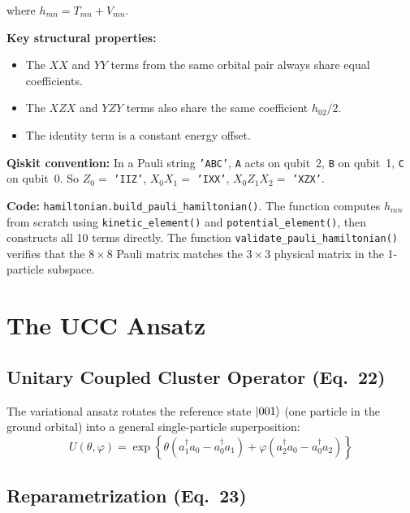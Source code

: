\documentclass[11pt,a4paper]{article}
\begin{document}
where $h_{mn} = T_{mn} + V_{mn}$.

\textbf{Key structural properties:}
\begin{itemize}[nosep]
  \item The $XX$ and $YY$ terms from the same orbital pair always share equal coefficients.
  \item The $XZX$ and $YZY$ terms also share the same coefficient $h_{02}/2$.
  \item The identity term is a constant energy offset.
\end{itemize}

\vspace{0.3em}
\noindent\textbf{Qiskit convention:} In a Pauli string \texttt{'ABC'}, \texttt{A} acts on qubit~2, \texttt{B} on qubit~1, \texttt{C} on qubit~0. So $Z_0 = $ \texttt{'IIZ'}, $X_0 X_1 = $ \texttt{'IXX'}, $X_0 Z_1 X_2 = $ \texttt{'XZX'}.

\vspace{0.3em}
\noindent\textbf{Code:} \texttt{hamiltonian.build\_pauli\_hamiltonian()}. The function computes $h_{mn}$ from scratch using \texttt{kinetic\_element()} and \texttt{potential\_element()}, then constructs all 10 terms directly. The function \texttt{validate\_pauli\_hamiltonian()} verifies that the $8\times 8$ Pauli matrix matches the $3\times 3$ physical matrix in the 1-particle subspace.


\section{The UCC Ansatz}

\subsection{Unitary Coupled Cluster Operator (Eq.~22)}

The variational ansatz rotates the reference state $\ket{001}$ (one particle in the ground orbital) into a general single-particle superposition:
\begin{equation}
  U(\theta, \varphi) = \exp\left\{
    \theta(a_1^\dagger a_0 - a_0^\dagger a_1)
    + \varphi(a_2^\dagger a_0 - a_0^\dagger a_2)
  \right\}
  \label{eq:ucc}
\end{equation}

\subsection{Reparametrization (Eq.~23)}
\end{document}
